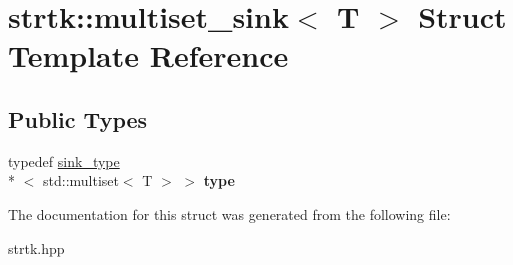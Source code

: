 \hypertarget{structstrtk_1_1multiset__sink}{\section{strtk\-:\-:multiset\-\_\-sink$<$ T $>$ Struct Template Reference}
\label{structstrtk_1_1multiset__sink}
}
\subsection*{Public Types}
\begin{DoxyCompactItemize}
\item 
\hypertarget{structstrtk_1_1multiset__sink_a8e6d9a502c3d15c46b48804ea2d3d0f4}{typedef \hyperlink{classstrtk_1_1sink__type}{sink\-\_\-type}\\*
$<$ std\-::multiset$<$ T $>$ $>$ {\bfseries type}}\label{structstrtk_1_1multiset__sink_a8e6d9a502c3d15c46b48804ea2d3d0f4}

\end{DoxyCompactItemize}


The documentation for this struct was generated from the following file\-:\begin{DoxyCompactItemize}
\item 
strtk.\-hpp\end{DoxyCompactItemize}
